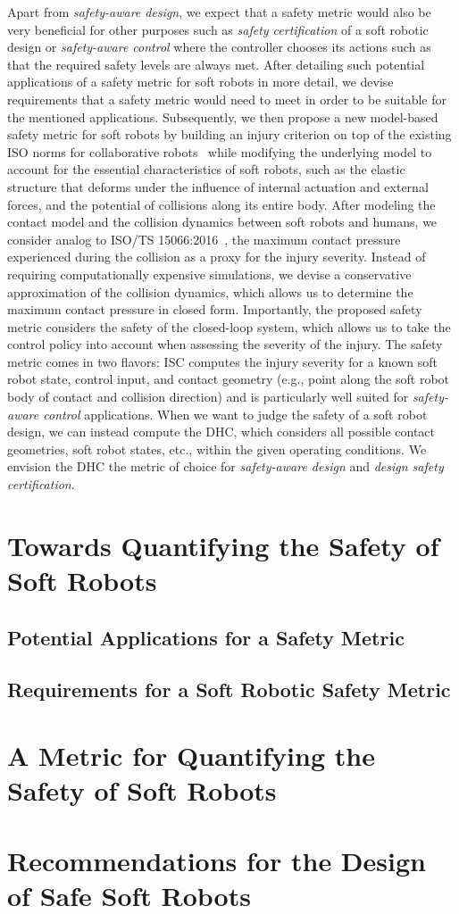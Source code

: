 Apart from \emph{safety-aware design}, we expect that a safety metric would also be very beneficial for other purposes such as \emph{safety certification} of a soft robotic design or \emph{safety-aware control} where the controller chooses its actions such as that the required safety levels are always met.
After detailing such potential applications of a safety metric for soft robots in more detail, we devise requirements that a safety metric would need to meet in order to be suitable for the mentioned applications.
Subsequently, we then propose a new model-based safety metric for soft robots by building an injury criterion on top of the existing ISO norms for collaborative robots~\citep{Isots_15066_2016} while modifying the underlying model to account for the essential characteristics of soft robots, such as the elastic structure that deforms under the influence of internal actuation and external forces, and the potential of collisions along its entire body.
After modeling the contact model and the collision dynamics between soft robots and humans, we consider analog to ISO/TS 15066:2016~\citep{Isots_15066_2016}, the maximum contact pressure experienced during the collision as a proxy for the injury severity. Instead of requiring computationally expensive simulations, we devise a conservative approximation of the collision dynamics, which allows us to determine the maximum contact pressure in closed form.
Importantly, the proposed safety metric considers the safety of the closed-loop system, which allows us to take the control policy into account when assessing the severity of the injury.
The safety metric comes in two flavors: \gls{ISC} computes the injury severity for a known soft robot state, control input, and contact geometry (e.g., point along the soft robot body of contact and collision direction) and is particularly well suited for \emph{safety-aware control} applications. 
When we want to judge the safety of a soft robot design, we can instead compute the \gls{DHC}, which considers all possible contact geometries, soft robot states, etc., within the given operating conditions. We envision the \gls{DHC} the metric of choice for \emph{safety-aware design} and \emph{design safety certification}.

\section{Towards Quantifying the Safety of Soft Robots}
\subsection{Potential Applications for a Safety Metric}
\subsection{Requirements for a Soft Robotic Safety Metric}
\section{A Metric for Quantifying the Safety of Soft Robots}
\section{Recommendations for the Design of Safe Soft Robots}
